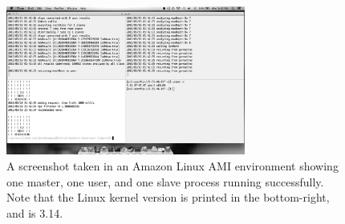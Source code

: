 \documentclass[pdftex,12pt,a4paper]{article}
\begin{document}
\begin{figure}[h]
\begin{center}
\includegraphics[width=0.7\textwidth]{img/linux}
\caption{A screenshot taken in an Amazon Linux AMI environment showing one master, one user, and one slave process running successfully. Note that the Linux kernel version is printed in the bottom-right, and is 3.14.}
\label{fig:linux}
\end{center}
\end{figure}
\end{document}
